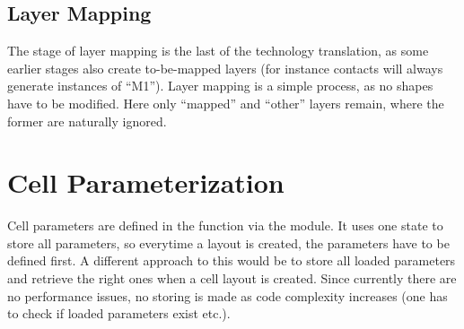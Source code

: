 \subsection{Layer Mapping}
The stage of layer mapping is the last of the technology translation, as some earlier stages also create to-be-mapped layers (for instance contacts will always
generate instances of \enquote{M1}). Layer mapping is a simple process, as no shapes have to be modified. Here only \enquote{mapped} and \enquote{other} layers
remain, where the former are naturally ignored.

\section{Cell Parameterization}
Cell parameters are defined in the  function via the  module. It uses one state to store all parameters, so everytime a
layout is created, the parameters have to be defined first. A different approach to this would be to store all loaded parameters and retrieve the right ones when a
cell layout is created. Since currently there are no performance issues, no storing is made as code complexity increases (one has to check if loaded parameters exist
etc.). 


